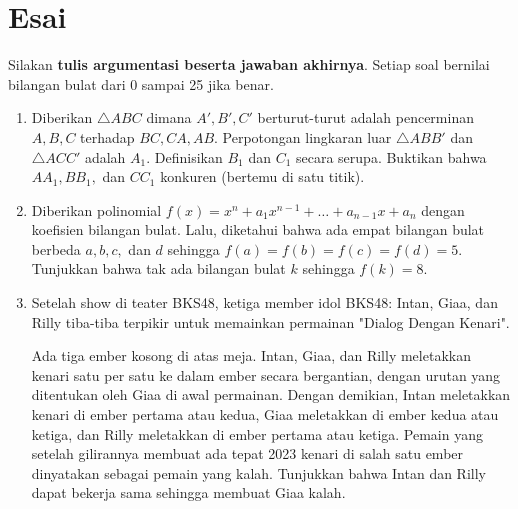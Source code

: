 \documentclass[12pt]{scrartcl}
\begin{document}
\section{Esai}
Silakan \textbf{tulis argumentasi beserta jawaban akhirnya}. Setiap soal bernilai bilangan bulat dari 0 sampai 25 jika benar.
\begin{enumerate}[resume]
    \item Diberikan $\triangle ABC$ dimana $A',B',C'$ berturut-turut adalah pencerminan $A,B,C$ terhadap $BC,CA,AB$. Perpotongan lingkaran luar $\triangle ABB'$ dan $\triangle ACC'$ adalah $A_1$. Definisikan $B_1$ dan $C_1$ secara serupa. Buktikan bahwa $AA_1,BB_1,$ dan $CC_1$ konkuren (bertemu di satu titik).

    \item Diberikan polinomial $f(x)=x^n+a_1x^{n-1}+\dots+a_{n-1}x+a_n$ dengan koefisien bilangan bulat. Lalu, diketahui bahwa ada empat bilangan bulat berbeda $a,b,c,$ dan $d$ sehingga $f(a)=f(b)=f(c)=f(d)=5$. Tunjukkan bahwa tak ada bilangan bulat $k$ sehingga $f(k)=8$.

    \item Setelah show di teater BKS48, ketiga member idol BKS48: Intan, Giaa, dan Rilly tiba-tiba terpikir untuk memainkan permainan "Dialog Dengan Kenari".
    
    Ada tiga ember kosong di atas meja. Intan, Giaa, dan Rilly meletakkan kenari satu per satu ke dalam ember secara bergantian, dengan urutan yang ditentukan oleh Giaa di awal permainan. Dengan demikian, Intan meletakkan kenari di ember pertama atau kedua, Giaa meletakkan di ember kedua atau ketiga, dan Rilly meletakkan di ember pertama atau ketiga. Pemain yang setelah gilirannya membuat ada tepat 2023 kenari di salah satu ember dinyatakan sebagai pemain yang kalah. Tunjukkan bahwa Intan dan Rilly dapat bekerja sama sehingga membuat Giaa kalah.
\end{enumerate}
\end{document}
